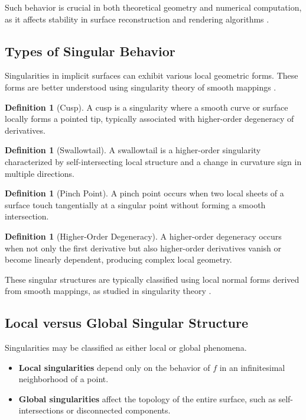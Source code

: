 \documentclass[12pt, a4paper, oneside]{book}
\theoremstyle{plain}
\theoremstyle{definition}
\newtheorem{definition}[theorem]{Definition}
\theoremstyle{remark}
\theoremstyle{definition}
\begin{document}
Such behavior is crucial in both theoretical geometry and numerical computation, as it affects stability in surface reconstruction and rendering algorithms \cite{bloomenthal2000implicit}.

\subsection{Types of Singular Behavior}

Singularities in implicit surfaces can exhibit various local geometric forms. These forms are better understood using singularity theory of smooth mappings \cite{arnold2012singularities}.

\begin{definition}[Cusp]
A cusp is a singularity where a smooth curve or surface locally forms a pointed tip, typically associated with higher-order degeneracy of derivatives.
\end{definition}

\begin{definition}[Swallowtail]
A swallowtail is a higher-order singularity characterized by self-intersecting local structure and a change in curvature sign in multiple directions.
\end{definition}

\begin{definition}[Pinch Point]
A pinch point occurs when two local sheets of a surface touch tangentially at a singular point without forming a smooth intersection.
\end{definition}

\begin{definition}[Higher-Order Degeneracy]
A higher-order degeneracy occurs when not only the first derivative but also higher-order derivatives vanish or become linearly dependent, producing complex local geometry.
\end{definition}

These singular structures are typically classified using local normal forms derived from smooth mappings, as studied in singularity theory \cite{arnold2012singularities}.

\subsection{Local versus Global Singular Structure}

Singularities may be classified as either local or global phenomena.

\begin{itemize}
    \item \textbf{Local singularities} depend only on the behavior of $f$ in an infinitesimal neighborhood of a point.
    \item \textbf{Global singularities} affect the topology of the entire surface, such as self-intersections or disconnected components.
\end{itemize}
\end{document}
